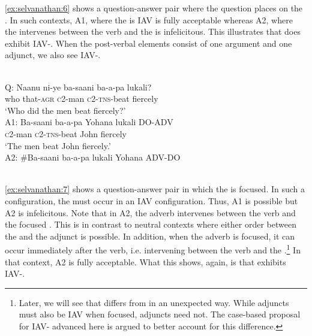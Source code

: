 \documentclass[output=paper
,newtxmath
,modfonts
,nonflat]{langsci/langscibook}
\begin{document}
\ref{ex:selvanathan:6} shows a question-answer pair where the question places  on the . In such contexts, A1, where the  is IAV is fully acceptable whereas A2, where the  intervenes between the verb and the  is infelicitous. This illustrates that  does exhibit IAV-. When the post-verbal elements consist of one argument and one adjunct, we also see IAV-.

\ea\label{ex:selvanathan:7}
\\

Q: \gll Naanu  ni-ye    ba-saani   ba-a-pa     lukali?\\
who  that-\textsc{agr}   \textsc{c}2-man   \textsc{c}2-\textsc{tns}{}-beat  fiercely\\

\glt \-\hspace{0.5cm}`Who did the men beat fiercely?'\\

A1: \gll Ba-saani  ba-a-pa  Yohana      lukali DO-ADV\\
	\textsc{c}2-man   \textsc{c}2-\textsc{tns}{}-beat  John          fiercely\\
\glt \-\hspace{0.5cm}`The men beat John fiercely.'\\

A2: \gll \#Ba-saani  ba-a-pa  lukali        Yohana ADV-DO \\
	\\
\z

\ref{ex:selvanathan:7} shows a question-answer pair in which the  is focused. In such a configuration, the  must occur in an IAV configuration. Thus, A1 is possible but A2 is infelicitous. Note that in A2, the adverb intervenes between the verb and the focused . This is in contrast to neutral contexts where either order between the  and the adjunct is possible. In addition, when the adverb is focused, it can occur immediately after the verb, i.e. intervening between the verb and the .\footnote{Later, we will see that  differs from  in an unexpected way. While  adjuncts must also be IAV when focused,  adjuncts need not. The case-based proposal for IAV- advanced here is argued to better account for this difference.}  In that context, A2 is fully acceptable. What this shows, again, is that  exhibits IAV-.
\end{document}
